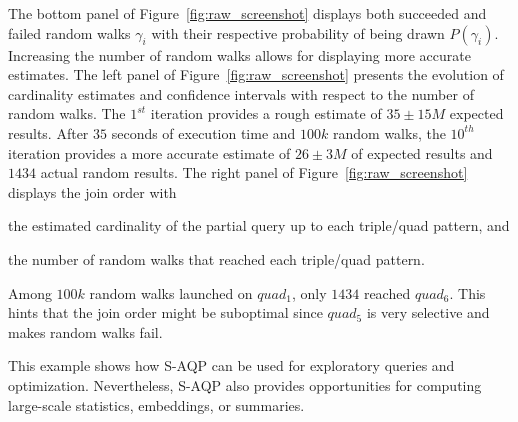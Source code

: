 \noindent The bottom panel of Figure~\ref{fig:raw_screenshot} displays
both succeeded and failed random walks $\gamma_i$ with their
respective probability of being drawn $P(\gamma_i)$.  Increasing the
number of random walks allows for displaying more accurate estimates.  The
left panel of Figure~\ref{fig:raw_screenshot} presents the evolution
of cardinality estimates and confidence intervals with respect to the
number of random walks.  The $1^{st}$ iteration provides a rough
estimate of $35 \pm 15M$ expected results. After $35$ seconds of
execution time and $100k$ random walks, the $10^{th}$ iteration
provides a more accurate estimate of $26 \pm 3M$ of expected results and $1434$ actual random results.
%
The right panel of Figure~\ref{fig:raw_screenshot} displays
the join order with
\begin{inparaenum}[(i)]
\item the estimated cardinality of the partial query up to each
  triple/quad pattern, and
\item the number of random walks that reached each triple/quad pattern.
\end{inparaenum}
Among $100k$ random walks launched on $quad_1$, only $1434$ reached
$quad_6$. This hints that the join order might be suboptimal since
$quad_5$ is very selective and makes random walks fail.


\noindent This example shows how S-AQP can be used for exploratory
queries and optimization. Nevertheless, S-AQP also provides
opportunities for computing large-scale statistics, embeddings, or
summaries.


